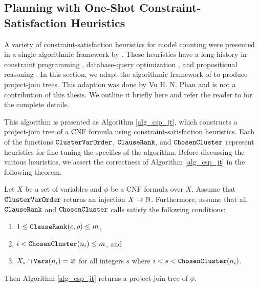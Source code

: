 \subsection{Planning with One-Shot Constraint-Satisfaction Heuristics}
\label{sec_csp}

A variety of constraint-satisfaction heuristics for model counting were presented in a single algorithmic framework by \cite{DPV20}.
These heuristics have a long history in constraint programming \cite{dechter03}, database-query optimization \cite{MPPV04}, and propositional reasoning \cite{pan2005symbolic}.
In this section, we adapt the algorithmic framework of \cite{DPV20,phan2019weighted} to produce project-join trees.
This adaption was done by Vu H. N. Phan and is not a contribution of this thesis. We outline it briefly here and refer the reader to \cite{dudek2020dpmc} for the complete details.

This algorithm is presented as Algorithm \ref{alg_csp_jt}, which constructs a project-join tree of a CNF formula using constraint-satisfaction heuristics.
Each of the functions $\texttt{\upshape ClusterVarOrder}$, $\texttt{\upshape ClauseRank}$, and $\texttt{\upshape ChosenCluster}$ represent heuristics for fine-tuning the specifics of the algorithm.
Before discussing the various heuristics, we assert the correctness of Algorithm \ref{alg_csp_jt} in the following theorem.
\begin{theorem}
\label{thm_csp_jt}
    Let $X$ be a set of variables and $\phi$ be a CNF formula over $X$.
    Assume that $\texttt{\upshape ClusterVarOrder}$ returns an injection $X \to \mathbb{N}$.
    Furthermore, assume that all $\texttt{\upshape ClauseRank}$ and $\texttt{\upshape ChosenCluster}$ calls satisfy the following conditions:
    \begin{enumerate}[ref=\arabic*]
        \item $1 \le \texttt{\upshape ClauseRank}(c, \rho) \le m$, \label{cond1}
        \item $i < \texttt{\upshape ChosenCluster}(n_i) \le m$, and \label{cond2}
        \item $X_s \cap \texttt{\upshape Vars}(n_i) = \varnothing$ for all integers $s$ where $i < s < \texttt{\upshape ChosenCluster}(n_i)$. \label{cond3}
    \end{enumerate}
    Then Algorithm \ref{alg_csp_jt} returns a project-join tree of $\phi$.
\end{theorem}

